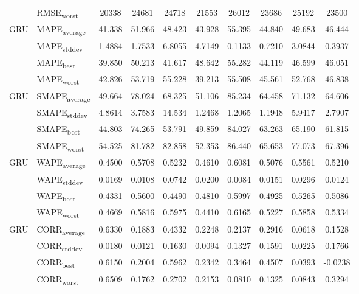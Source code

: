 {\begin{longtable}{l l c c c c c c c c}
 & RMSE\textsubscript{worst} & 20338 & 24681 & 24718 & 21553 & 26012 & 23686 & 25192 & 23500 \\
\cmidrule(lr){2-10}
\multirow{4}{*}{GRU} & MAPE\textsubscript{average} & 41.338 & 51.966 & 48.423 & 43.928 & 55.395 & 44.840 & 49.683 & 46.444 \\
 & MAPE\textsubscript{stddev} & 1.4884 & 1.7533 & 6.8055 & 4.7149 & 0.1133 & 0.7210 & 3.0844 & 0.3937 \\
 & MAPE\textsubscript{best} & 39.850 & 50.213 & 41.617 & 48.642 & 55.282 & 44.119 & 46.599 & 46.051 \\
 & MAPE\textsubscript{worst} & 42.826 & 53.719 & 55.228 & 39.213 & 55.508 & 45.561 & 52.768 & 46.838 \\
\cmidrule(lr){2-10}
\multirow{4}{*}{GRU} & SMAPE\textsubscript{average} & 49.664 & 78.024 & 68.325 & 51.106 & 85.234 & 64.458 & 71.132 & 64.606 \\
 & SMAPE\textsubscript{stddev} & 4.8614 & 3.7583 & 14.534 & 1.2468 & 1.2065 & 1.1948 & 5.9417 & 2.7907 \\
 & SMAPE\textsubscript{best} & 44.803 & 74.265 & 53.791 & 49.859 & 84.027 & 63.263 & 65.190 & 61.815 \\
 & SMAPE\textsubscript{worst} & 54.525 & 81.782 & 82.858 & 52.353 & 86.440 & 65.653 & 77.073 & 67.396 \\
\cmidrule(lr){2-10}
\multirow{4}{*}{GRU} & WAPE\textsubscript{average} & 0.4500 & 0.5708 & 0.5232 & 0.4610 & 0.6081 & 0.5076 & 0.5561 & 0.5210 \\
 & WAPE\textsubscript{stddev} & 0.0169 & 0.0108 & 0.0742 & 0.0200 & 0.0084 & 0.0151 & 0.0296 & 0.0124 \\
 & WAPE\textsubscript{best} & 0.4331 & 0.5600 & 0.4490 & 0.4810 & 0.5997 & 0.4925 & 0.5265 & 0.5086 \\
 & WAPE\textsubscript{worst} & 0.4669 & 0.5816 & 0.5975 & 0.4410 & 0.6165 & 0.5227 & 0.5858 & 0.5334 \\
\cmidrule(lr){2-10}
\multirow{4}{*}{GRU} & CORR\textsubscript{average} & 0.6330 & 0.1883 & 0.4332 & 0.2248 & 0.2137 & 0.2916 & 0.0618 & 0.1528 \\
 & CORR\textsubscript{stddev} & 0.0180 & 0.0121 & 0.1630 & 0.0094 & 0.1327 & 0.1591 & 0.0225 & 0.1766 \\
 & CORR\textsubscript{best} & 0.6150 & 0.2004 & 0.5962 & 0.2342 & 0.3464 & 0.4507 & 0.0393 & -0.0238 \\
 & CORR\textsubscript{worst} & 0.6509 & 0.1762 & 0.2702 & 0.2153 & 0.0810 & 0.1325 & 0.0843 & 0.3294 \\

\end{longtable}}
